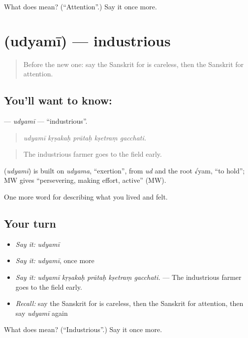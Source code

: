 \begin{tcolorbox}[breakable,colback=teal!4,colframe=teal!35!black,title={Before you move on}]
What does  mean? (\textquotedblleft{}Attention\textquotedblright{}.) Say it once more.
\end{tcolorbox}
\section[\texorpdfstring{\sk{उद्यमी} (udyamī)}{उद्यमी (udyamī)}]{ (udyamī) — industrious}

\label{lesson:SA-C465-udyami}



\begin{quote}
Before the new one: say the Sanskrit for is careless, then the Sanskrit for attention.
\end{quote}

\subsection*{You'll want to know: }
\textbf{} — \emph{udyamī} — \textquotedblleft{}industrious\textquotedblright{}.

\begin{quote}
    
\end{quote}

\begin{quote}
\emph{udyamī kṛṣakaḥ prātaḥ kṣetraṃ gacchati.}
\end{quote}

\begin{quote}
The industrious farmer goes to the field early.
\end{quote}

\begin{cousinweb}
\textbf{} (\emph{udyamī}) is built on \emph{udyama}, \textquotedblleft{}exertion\textquotedblright{}, from \emph{ud} and the root √yam, \textquotedblleft{}to hold\textquotedblright{}; MW gives \textquotedblleft{}persevering, making effort, active\textquotedblright{} (MW).
\end{cousinweb}

\begin{grammarlens}[title={What you've built}]
One more word for describing what you lived and felt.
\end{grammarlens}

\subsection*{Your turn}
\begin{itemize}
\raggedright
  \item \emph{Say it:} \emph{udyamī}
  \item \emph{Say it:} \emph{udyamī}, once more
  \item \emph{Say it:} \emph{udyamī kṛṣakaḥ prātaḥ kṣetraṃ gacchati.} — The industrious farmer goes to the field early.
  \item \emph{Recall:} say the Sanskrit for is careless, then the Sanskrit for attention, then say \emph{udyamī} again
\end{itemize}

\begin{tcolorbox}[breakable,colback=teal!4,colframe=teal!35!black,title={Before you move on}]
What does  mean? (\textquotedblleft{}Industrious\textquotedblright{}.) Say it once more.
\end{tcolorbox}
